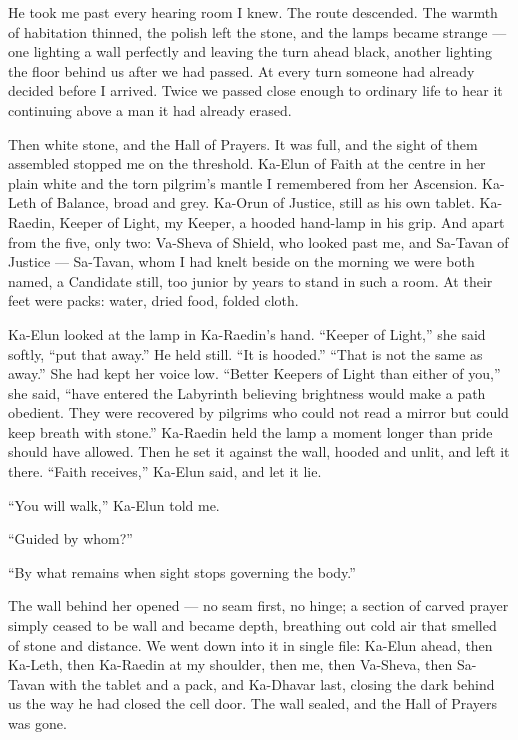He took me past every hearing room I knew. The route descended. The warmth of habitation thinned, the polish left the stone, and the lamps became strange --- one lighting a wall perfectly and leaving the turn ahead black, another lighting the floor behind us after we had passed. At every turn someone had already decided before I arrived. Twice we passed close enough to ordinary life to hear it continuing above a man it had already erased.\par
 
Then white stone, and the Hall of Prayers. It was full, and the sight of them assembled stopped me on the threshold. Ka-Elun of Faith at the centre in her plain white and the torn pilgrim's mantle I remembered from her Ascension. Ka-Leth of Balance, broad and grey. Ka-Orun of Justice, still as his own tablet. Ka-Raedin, Keeper of Light, my Keeper, a hooded hand-lamp in his grip. And apart from the five, only two: Va-Sheva of Shield, who looked past me, and Sa-Tavan of Justice --- Sa-Tavan, whom I had knelt beside on the morning we were both named, a Candidate still, too junior by years to stand in such a room. At their feet were packs: water, dried food, folded cloth.\par
 
Ka-Elun looked at the lamp in Ka-Raedin's hand. ``Keeper of Light,'' she said softly, ``put that away.'' He held still. ``It is hooded.'' ``That is not the same as away.'' She had kept her voice low. ``Better Keepers of Light than either of you,'' she said, ``have entered the Labyrinth believing brightness would make a path obedient. They were recovered by pilgrims who could not read a mirror but could keep breath with stone.'' Ka-Raedin held the lamp a moment longer than pride should have allowed. Then he set it against the wall, hooded and unlit, and left it there. ``Faith receives,'' Ka-Elun said, and let it lie.\par
 
``You will walk,'' Ka-Elun told me.\par
 
``Guided by whom?''\par
 
``By what remains when sight stops governing the body.''\par
 
The wall behind her opened --- no seam first, no hinge; a section of carved prayer simply ceased to be wall and became depth, breathing out cold air that smelled of stone and distance. We went down into it in single file: Ka-Elun ahead, then Ka-Leth, then Ka-Raedin at my shoulder, then me, then Va-Sheva, then Sa-Tavan with the tablet and a pack, and Ka-Dhavar last, closing the dark behind us the way he had closed the cell door. The wall sealed, and the Hall of Prayers was gone.\par
 

